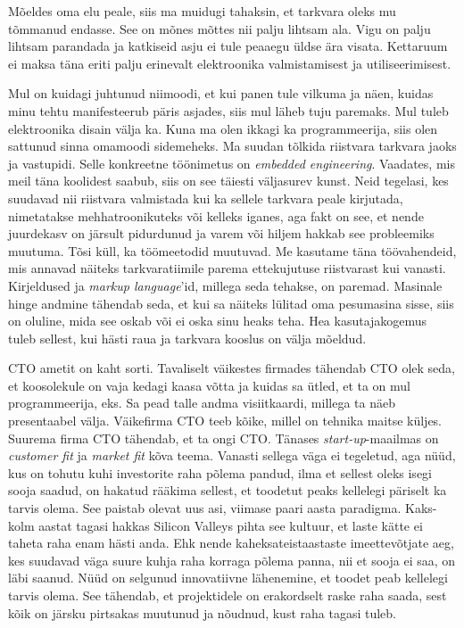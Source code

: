 Mõeldes oma elu peale, siis ma muidugi tahaksin, et tarkvara oleks mu tõmmanud 
endasse. See on mõnes mõttes nii palju lihtsam ala. Vigu on palju 
lihtsam parandada ja katkiseid asju ei tule peaaegu üldse ära visata. 
Kettaruum ei maksa täna eriti palju erinevalt elektroonika valmistamisest ja
utiliseerimisest.

Mul on kuidagi juhtunud niimoodi, et kui panen 
tule vilkuma ja näen, kuidas minu tehtu manifesteerub päris asjades, 
siis mul läheb tuju paremaks. Mul tuleb elektroonika disain välja ka. Kuna ma 
olen ikkagi ka
programmeerija, siis olen sattunud sinna omamoodi sidemeheks. Ma suudan tõlkida 
riistvara tarkvara jaoks ja vastupidi. Selle konkreetne töönimetus on 
\emph{embedded engineering}. Vaadates, mis meil täna koolidest 
saabub, siis on see täiesti väljasurev kunst. Neid tegelasi, kes suudavad nii 
riistvara valmistada kui ka sellele tarkvara peale kirjutada, 
nimetatakse mehhatroonikuteks või kelleks iganes, aga fakt on see, et nende 
juurdekasv on järsult pidurdunud ja varem või hiljem hakkab see 
probleemiks muutuma. Tõsi küll, ka töömeetodid muutuvad. Me kasutame täna
töövahendeid, mis annavad näiteks tarkvaratiimile parema 
ettekujutuse riistvarast kui vanasti. Kirjeldused ja 
\emph{markup language}'id, millega seda tehakse, on paremad. Masinale hinge 
andmine tähendab seda, et kui sa näiteks lülitad oma pesumasina sisse, siis on 
oluline, mida see oskab või ei oska sinu 
heaks teha. Hea kasutajakogemus tuleb sellest, kui hästi raua ja tarkvara 
kooslus 
on välja mõeldud. 


CTO ametit on kaht sorti. Tavaliselt väikestes firmades tähendab 
CTO olek seda, et koosolekule on vaja kedagi kaasa võtta ja kuidas sa 
ütled, et ta on mul programmeerija, eks. Sa pead talle andma 
visiitkaardi, millega ta näeb presentaabel välja. Väikefirma CTO 
teeb kõike, millel on tehnika maitse 
küljes. Suurema firma CTO tähendab, et ta ongi CTO. Tänases 
\emph{start-up}-maailmas on \emph{customer fit} ja \emph{market fit} kõva 
teema. 
Vanasti sellega väga ei tegeletud, aga nüüd, kus on tohutu kuhi 
investorite raha põlema pandud, ilma et sellest oleks isegi sooja saadud, on 
hakatud rääkima sellest, et toodetut peaks kellelegi päriselt ka
tarvis olema. See paistab olevat uus asi, viimase paari aasta 
paradigma. Kaks-kolm aastat tagasi hakkas Silicon Valleys 
pihta see kultuur, et laste kätte ei taheta raha enam hästi anda. Ehk 
nende kaheksateistaastaste imeettevõtjate aeg, kes suudavad väga suure kuhja 
raha 
korraga põlema panna, nii et sooja ei saa, on läbi saanud. Nüüd on selgunud 
innovatiivne lähenemine, et toodet peab 
kellelegi tarvis olema. See tähendab, et projektidele on erakordselt raske raha 
saada, sest kõik 
on järsku pirtsakas muutunud ja nõudnud, kust raha tagasi tuleb. 

